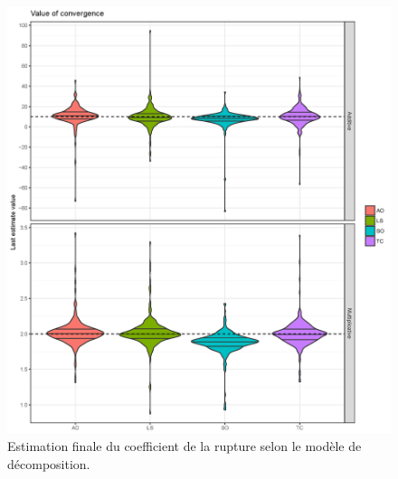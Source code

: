 \documentclass[12pt, a4paper, french]{article}
\begin{document}
\begin{figure}[!ht]
\begin{center}
 \includegraphics[scale=0.65]{img/OutliersValue.png}
 \caption{Estimation finale du coefficient de la rupture selon le modèle de décomposition.}
 \label{fig:OutliersValue}
\end{center}
\end{figure}
\end{document}
